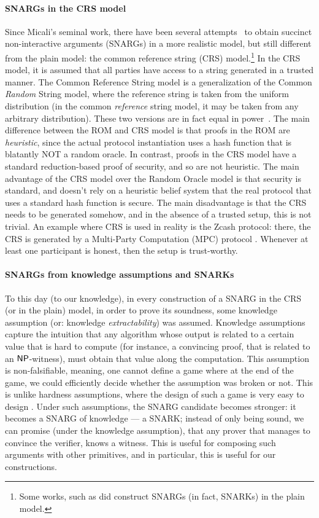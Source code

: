 \paragraph{SNARGs in the CRS model}
Since Micali's seminal work, there have been several attempts~\cite{aiello2000fast, dwork2004succinct, di2008succinct, groth2010short, bitansky2012extractable} to obtain succinct non-interactive arguments (SNARGs) in a more realistic model, but still different from the plain model: the common reference string (CRS) model.\footnote{
Some works, such as \cite{bitansky2013recursive} did construct SNARGs (in fact, SNARKs) in the plain model.
} In the CRS model, it is assumed that all parties have access to a string generated in a trusted manner. The Common Reference String model is a generalization of the Common \emph{Random} String model, where the reference string is taken from the uniform distribution (in the common \emph{reference} string model, it may be taken from any arbitrary distribution). These two versions are in fact equal in power~\cite{canetti2001universally}. The main difference between the ROM and CRS model is that proofs in the ROM are \emph{heuristic}, since the actual protocol instantiation uses a hash function that is blatantly NOT a random oracle. In contrast, proofs in the CRS model have a standard reduction-based proof of security, and so are not heuristic. The main advantage of the CRS model over the Random Oracle model is that security is standard, and doesn't rely on a heuristic belief system that the real protocol that uses a standard hash function is secure. The main disadvantage is that the CRS needs to be generated somehow, and in the absence of a trusted setup, this is not trivial. An example where CRS is used in reality is the Zcash protocol: there, the CRS is generated by a Multi-Party Computation (MPC) protocol \cite{crsZkSnark}. Whenever at least  one participant is honest, then the setup is trust-worthy.

\paragraph{SNARGs from knowledge assumptions and SNARKs}
To this day (to our knowledge), in every construction of a SNARG in the CRS (or in the plain) model, in order to prove its soundness, some knowledge assumption (or: knowledge \emph{extractability}) was assumed. Knowledge assumptions capture the intuition that any algorithm whose output is related to a certain value that is hard to compute (for instance, a convincing proof, that is related to an ${\mathsf{NP}}$-witness), must obtain that value along the computation. This assumption is non-falsifiable, meaning, one cannot define a game where at the end of the game, we could efficiently decide whether the assumption was broken or not. This is unlike hardness assumptions, where the design of such a game is very easy to design . Under such assumptions, the SNARG candidate becomes stronger: it becomes a SNARG of knowledge --- a SNARK; instead of only being sound, we can promise (under the knowledge assumption), that any prover that manages to convince the verifier, knows a witness. This is useful for composing such arguments with other primitives, and in particular, this is useful for our constructions.

